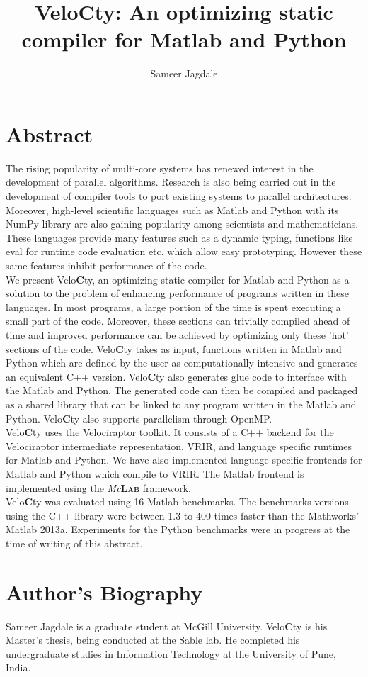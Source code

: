 \documentclass[a4paper, 12pt]{article}
\newcommand{\matlab}{{\textsc Matlab}\xspace}
\newcommand{\velocty}{{Velo\textbf{C}ty}\xspace}
\newcommand{\smclab}{\textrm{\textsl{Mc}\textbf{\textsc{Lab}}}}
\newcommand{\mclab}{\smclab\xspace}
\begin{document}
\title{\velocty : An optimizing static compiler for \matlab and Python}
\author[1]{Sameer Jagdale}
\maketitle
\section*{Abstract}
The rising popularity of multi-core systems has renewed interest in the development of parallel algorithms. Research is also being carried out in the development of compiler tools to port existing systems to parallel architectures. Moreover, high-level scientific languages such as \matlab and Python with its NumPy library are also gaining popularity among scientists and mathematicians. These languages provide many features such as a dynamic typing, functions like eval for runtime code evaluation etc. which allow easy prototyping. However these same features inhibit performance of the code. \\ 
We present \velocty, an optimizing static compiler for \matlab and Python as a solution to the problem of enhancing performance of programs written in these languages. In most programs, a large portion of the time is spent executing a small part of the code. Moreover, these sections can trivially compiled ahead of time and improved performance can be achieved by optimizing only these 'hot' sections of the code. \velocty takes as input, functions written in \matlab and Python which are defined by the user as computationally intensive and generates an equivalent C++ version. \velocty also generates glue code to interface with the \matlab and Python. The generated code can then be compiled and packaged as a shared library that can be linked to any program written in the \matlab and Python. \velocty also supports parallelism through OpenMP.\\
\velocty uses the Velociraptor toolkit. It consists of a C++ backend for the Velociraptor intermediate representation, VRIR, and language specific runtimes for \matlab and Python. We have also implemented language specific frontends for \matlab and Python which compile to VRIR. The \matlab frontend is implemented using the \mclab framework. \\
\velocty was evaluated using 16 \matlab benchmarks. The benchmarks versions using the C++ library were between 1.3 to 400 times faster than the Mathworks' \matlab2013a. Experiments for the Python benchmarks were in progress at the time of writing of this abstract.
\section*{Author's Biography}
Sameer Jagdale is a graduate student at McGill University. \velocty is his Master's thesis, being conducted at the Sable lab. He completed his undergraduate studies in Information Technology at the University of Pune, India.
\end{document}
